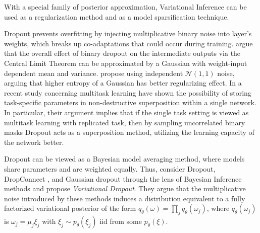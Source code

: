 \documentclass[a4paper,10pt,onecolumn]{article}
\begin{document}
With a special family of posterior approximation, Variational Inference can be used as
a regularization method and as a model sparsification technique.

Dropout \citep{hinton_improving_2012} prevents overfitting by injecting multiplicative
binary noise into layer's weights, which breaks up co-adaptations that could occur
during training. \citet{wang_fast_2013} argue that the overall effect of binary dropout
on the intermediate outputs via the Central Limit Theorem can be approximated by a Gaussian
with weight-input dependent mean and variance. \citet{srivastava_dropout_2014} propose
using independent $\mathcal{N}(1,1)$ noise, arguing that higher entropy of a Gaussian has
better regularizing effect. In a recent study concerning multitask learning
\citet{cheung_superposition_2019} have shown the possibility of storing task-specific
parameters in non-destructive superposition within a single network. In particular, their
argument implies that if the single task setting is viewed as multitask learning with
replicated task, then by sampling uncorrelated binary masks Dropout acts as a superposition
method, utilizing the learning capacity of the network better.

Dropout can be viewed as a Bayesian model averaging method, where models share parameters
and are weighted equally. Thus, \citet{kingma_variational_2015} consider Dropout, DropConnect
\citep{wan_regularization_2013}, and Gaussian dropout \citep{wang_fast_2013} through the
lens of Bayesian Inference methods and propose \textit{Variational Dropout}. They argue that
the multiplicative noise introduced by these methods induces a distribution equivalent to
a fully factorized variational posterior of the form $
  q_\theta(\omega) = \prod_j q_{\theta}(\omega_j)
$, where $q_{\theta}(\omega_j)$ is $\omega_j = \mu_j \xi_j$ with $
  \xi_j \sim p_\theta(\xi_j)
$ iid from some $p_\theta(\xi)$.
\end{document}
